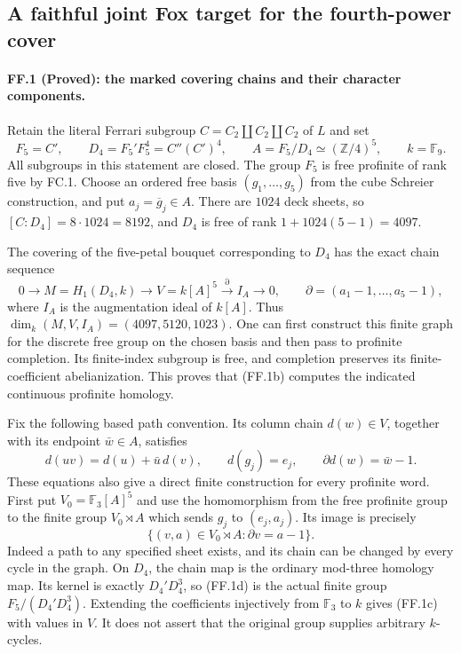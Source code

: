 \subsection*{A faithful joint Fox target for the fourth-power cover}

\paragraph{FF.1 (Proved): the marked covering chains and their character components.}
Retain the literal Ferrari subgroup $C=C_2\amalg C_2\amalg C_2$
of $L$ and set
\[
 F_5=C',\qquad D_4=F_5'F_5^4=C''(C')^4,\qquad
 A=F_5/D_4\simeq(\mathbb Z/4)^5,\qquad k=\mathbb F_9.
 \tag{FF.1a}
\]
All subgroups in this statement are closed. The group $F_5$ is free
profinite of rank five by FC.1. Choose an ordered free basis
$(g_1,\ldots,g_5)$ from the cube Schreier construction, and put
$a_j=\overline g_j\in A$. There are $1024$ deck sheets, so
$[C:D_4]=8\cdot1024=8192$, and $D_4$ is free of rank
$1+1024(5-1)=4097$.

The covering of the five-petal bouquet corresponding to $D_4$
has the exact chain sequence
\[
 0\longrightarrow M=H_1(D_4,k)
 \longrightarrow V=k[A]^5
 \stackrel{\partial}{\longrightarrow}I_A
 \longrightarrow0,\qquad
 \partial=(a_1-1,\ldots,a_5-1),
 \tag{FF.1b}
\]
where $I_A$ is the augmentation ideal of $k[A]$. Thus
$\dim_k(M,V,I_A)=(4097,5120,1023)$.
One can first construct this finite graph for the discrete free
group on the chosen basis and then pass to profinite completion.
Its finite-index subgroup is free, and completion preserves its
finite-coefficient abelianization. This proves that (FF.1b)
computes the indicated continuous profinite homology.

Fix the following based path convention. Its column chain
$d(w)\in V$, together with its endpoint $\bar w\in A$, satisfies
\[
 d(uv)=d(u)+\bar u\,d(v),\qquad
 d(g_j)=e_j,\qquad \partial d(w)=\bar w-1.
 \tag{FF.1c}
\]
These equations also give a direct finite construction for every
profinite word. First put $V_0=\mathbb F_3[A]^5$ and use the
homomorphism from the free profinite group to the finite group
$V_0\rtimes A$ which sends $g_j$ to $(e_j,a_j)$.
Its image is precisely
\[
 \{(v,a)\in V_0\rtimes A:\partial v=a-1\}.
 \tag{FF.1d}
\]
Indeed a path to any specified sheet exists, and its chain can
be changed by every cycle in the graph. On $D_4$, the chain
map is the ordinary mod-three homology map. Its kernel is
exactly $D_4'D_4^3$, so (FF.1d) is the actual finite group
$F_5/(D_4'D_4^3)$. Extending the coefficients injectively from
$\mathbb F_3$ to $k$ gives (FF.1c) with values in $V$.
It does not assert that the original group supplies arbitrary
$k$-cycles.

